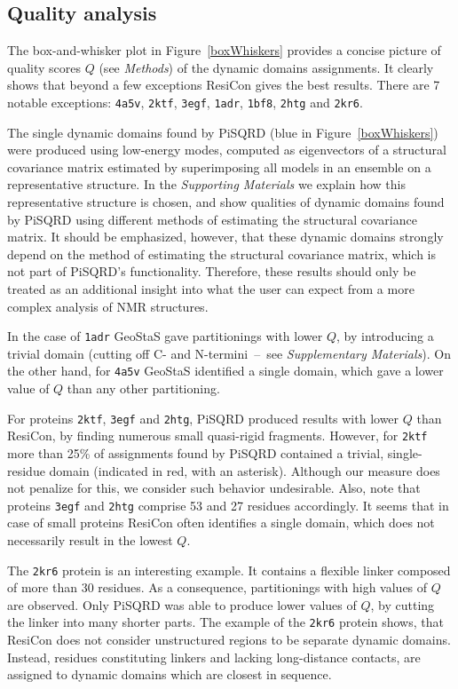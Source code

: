 \documentclass[a4paper,11pt,twoside]{book}%
\begin{document}
\subsection*{Quality analysis}

The box-and-whisker plot in Figure~\ref{boxWhiskers} provides a concise picture of quality scores $Q$ (see \emph{Methods}) of the dynamic domains assignments.
It clearly shows that beyond a few exceptions ResiCon gives the best results.
There are 7 notable exceptions: \texttt{4a5v}, \texttt{2ktf}, \texttt{3egf}, \texttt{1adr}, \texttt{1bf8}, \texttt{2htg} and \texttt{2kr6}.

The single dynamic domains found by PiSQRD (blue in Figure~\ref{boxWhiskers}) were produced using low-energy modes, computed as eigenvectors of a structural covariance matrix estimated by superimposing all models in an ensemble on a representative structure.
In the \emph{Supporting Materials} we explain how this representative structure is chosen, and show qualities of dynamic domains found by PiSQRD using different methods of estimating the structural covariance matrix.
It should be emphasized, however, that these dynamic domains strongly depend on the method of estimating the structural covariance matrix, which is not part of PiSQRD's functionality.
Therefore, these results should only be treated as an additional insight into what the user can expect from a more complex analysis of NMR structures.

In the case of \texttt{1adr} GeoStaS gave partitionings with lower $Q$, by introducing a trivial domain (cutting off C- and N-termini~--~see \emph{Supplementary Materials}).
On the other hand, for \texttt{4a5v} GeoStaS identified a single domain, which gave a lower value of $Q$ than any other partitioning.

For proteins \texttt{2ktf}, \texttt{3egf} and \texttt{2htg}, PiSQRD produced results with lower $Q$ than ResiCon, by finding numerous small quasi-rigid fragments.
However, for \texttt{2ktf} more than 25\% of assignments found by PiSQRD contained a trivial, single-residue domain (indicated in red, with an asterisk).
Although our measure does not penalize for this, we consider such behavior undesirable.
Also, note that proteins \texttt{3egf} and \texttt{2htg} comprise 53 and 27 residues accordingly.
It seems that in case of small proteins ResiCon often identifies a single domain, which does not necessarily result in the lowest $Q$.

The \texttt{2kr6} protein is an interesting example. 
It contains a flexible linker composed of more than 30 residues.
As a consequence, partitionings with high values of $Q$ are observed.
Only PiSQRD was able to produce lower values of $Q$, by cutting the linker into many shorter parts.
The example of the \texttt{2kr6} protein shows, that ResiCon does not consider unstructured regions to be separate dynamic domains.
Instead, residues constituting linkers and lacking long-distance contacts, are assigned to dynamic domains which are closest in sequence.
\end{document}
